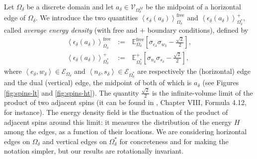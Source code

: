 \documentclass[oneside,english]{amsart}
\numberwithin{equation}{section}
\numberwithin{figure}{section}
\theoremstyle{plain}
\theoremstyle{plain}
\theoremstyle{plain}
\theoremstyle{plain}
\theoremstyle{plain}
\theoremstyle{definition}
\theoremstyle{remark}
\begin{document}
Let $\Omega_{\delta}$ be a discrete domain and let $a_{\delta}\in\mathcal{V}_{\Omega_{\delta}^{M}}$
be the midpoint of a horizontal edge of $\Omega_{\delta}$. We introduce
the two quantities $\left\langle \epsilon_{\delta}\left(a_{\delta}\right)\right\rangle _{\Omega_{\delta}}^{\mathrm{free}}$
and $\left\langle \epsilon_{\delta}\left(a_{\delta}\right)\right\rangle _{\Omega_{\delta}^{*}}^{+}$,
called \emph{average energy density} (with free and $+$ boundary
conditions), defined by 
\begin{eqnarray*}
\left\langle \epsilon_{\delta}\left(a_{\delta}\right)\right\rangle _{\Omega_{\delta}}^{\mathrm{free}} & \,:=\, & \mathbb{E}_{\Omega_{\delta}}^{\mathrm{free}}\left[\sigma_{e_{\delta}}\sigma_{w_{\delta}}-\frac{\sqrt{2}}{2}\right],\\
\left\langle \epsilon_{\delta}\left(a_{\delta}\right)\right\rangle _{\Omega_{\delta}^{*}}^{+} & \,:=\, & \mathbb{E}_{\Omega_{\delta}^{*}}^{+}\left[\sigma_{n_{\delta}}\sigma_{s_{\delta}}-\frac{\sqrt{2}}{2}\right],
\end{eqnarray*}
 where $\left\langle e_{\delta},w_{\delta}\right\rangle \in\mathcal{E}_{\Omega_{\delta}}$
and $\left\langle n_{\delta},s_{\delta}\right\rangle \in\mathcal{E}_{\Omega_{\delta}^{*}}$
are respectively the (horizontal) edge and the dual (vertical) edge,
the midpoint of both of which is $a_{\delta}$ (see Figures \ref{fig:spins-lt}
and \ref{fig:spins-ht}). The quantity $\frac{\sqrt{2}}{2}$ is the
infinite-volume limit of the product of two adjacent spins (it can
be found in \cite{mccoy-wu}, Chapter VIII, Formula 4.12, for instance).
The energy density field is the fluctuation of the product of adjacent
spins around this limit: it measures the distribution of the energy
\emph{$H$} among the edges, as a function of their locations. We
are considering horizontal edges on $\Omega_{\delta}$ and vertical
edges on $\Omega_{\delta}^{*}$ for concreteness and for making the
notation simpler, but our results are rotationally invariant.
\end{document}
